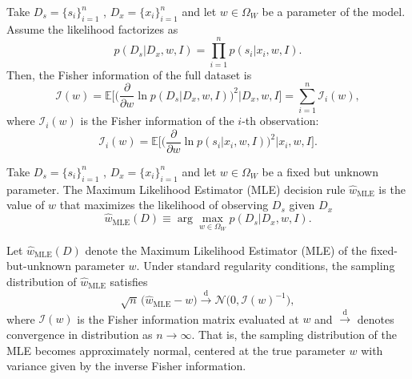 \begin{theorem}
	\label{thm:fisher_sample}
	Take $D_s= \{s_i\}_{i=1}^n$ , $D_x = \{x_i\}_{i=1}^n$ and let $w \in \Omega_W$ be a parameter of the model. Assume the likelihood factorizes as
	\begin{equation}
		p(D_s | D_x, w, I) = \prod_{i=1}^{n} p(s_i | x_i, w, I).
	\end{equation}
	Then, the Fisher information of the full dataset is
	\begin{equation}
		\mathcal{I}(w) 
		= \mathbb{E}\Bigg[\Big(\frac{\partial}{\partial w} \ln p(D_s | D_x, w, I)\Big)^2 \Bigg| D_x, w, I \Bigg] 
		= \sum_{i=1}^{n} \mathcal{I}_i(w),
	\end{equation}
	where $\mathcal{I}_i(w)$ is the Fisher information of the $i$-th observation:
	\begin{equation}
		\mathcal{I}_i(w) = \mathbb{E}\Bigg[\Bigg(\frac{\partial}{\partial w} \ln p(s_i | x_i, w, I)\Bigg)^2 \Bigg| x_i, w, I \Bigg].
	\end{equation}
\end{theorem}

\begin{definition}
	\label{def:MLE}
	Take $D_s= \{s_i\}_{i=1}^n$ , $D_x = \{x_i\}_{i=1}^n$ and let $w \in \Omega_W$ be a fixed but unknown parameter. The Maximum Likelihood Estimator (MLE) decision rule  $\hat{w}_{\mathrm{MLE}}$ is the value of $w$ that maximizes the likelihood of observing $D_s$ given $D_x$
	\begin{equation}
		\hat{w}_{\mathrm{MLE}}(D) \equiv \arg \max_{w \in \Omega_W} p(D_s | D_x, w, I).
	\end{equation}
\end{definition}

\begin{theorem}
	\label{thm:unbiased_mle}
	Let $\hat{w}_{\mathrm{MLE}}(D)$ denote the Maximum Likelihood Estimator (MLE) of the fixed-but-unknown parameter $w$. Under standard regularity conditions, the sampling distribution of $\hat{w}_{\mathrm{MLE}}$ satisfies
	\begin{equation}
		\sqrt{n}\,\big(\hat{w}_{\mathrm{MLE}} - w\big) \xrightarrow{\text{d}} \mathcal{N}\big(0, \mathcal{I}(w)^{-1}\big),
	\end{equation}
	where $\mathcal{I}(w)$ is the Fisher information matrix evaluated at $w$ and $\xrightarrow{\text{d}}$ denotes convergence in distribution as $n \to \infty$. 
	That is, the sampling distribution of the MLE becomes approximately normal, centered at the true parameter $w$ with variance given by the inverse Fisher information.
\end{theorem}



